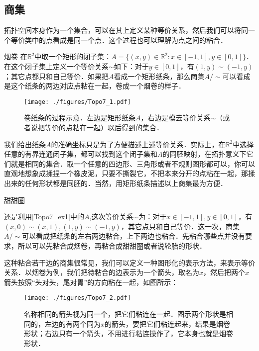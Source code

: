 
\subsection{商集}

拓扑空间本身作为一个集合，可以在其上定义某种等价关系，然后我们可以将同一个等价类中的点看成是同一个点．这个过程也可以理解为点之间的粘合．

\begin{example}{烟卷}\label{Topo7_ex1}
在$\mathbb{R}^2$中取一个矩形的闭子集：$A=\{(x,y)\in\mathbb{R}^2:x\in[-1,1],y\in[0,1]\}$．在这个闭子集上定义一个等价关系$\sim$如下：对于$y\in[0,1]$，有$(1, y)\sim(-1, y)$；其它点都只和自己等价．如果把$A$看成一个矩形纸条，那么商集$A/\sim$可以看成是这个纸条的两边对应点粘在一起，卷成一个烟卷的样子．

\begin{figure}[ht]
\centering
\texttt{[image: ./figures/Topo7\_1.pdf]}
\caption{卷纸条的过程示意．左边是矩形纸条$A$，右边是模去等价关系$\sim$（或者说把等价的点粘在一起）以后得到的集合．} \label{Topo7_fig1}
\end{figure}

\end{example}



我们给出纸条$A$的准确坐标只是为了方便描述上述等价关系．实际上，在$\mathbb{R}^2$中选择任意的有界连通闭子集，都可以找到这个闭子集和$A$的同胚映射，在拓扑意义下它们就是相同的集合．取一个任意的四边形、三角形或者不规则图形都可以，你可以直观地想象成揉捏一个橡皮泥，只要不撕裂它，不把本来分开的点粘在一起，那揉出来的任何形状都是同胚的．当然，用矩形纸条描述以上商集最为方便．

\begin{example}{甜甜圈}

还是利用\autoref{Topo7_ex1}中的$A$,这次等价关系$\sim$为：对于$x\in[-1,1], y\in[0,1]$，有$(x,0)\sim(x,1), (1, y)\sim(-1, y)$，其它点只和自己等价．这一次，商集$A/\sim$可以看成把纸条的左右两边粘合，上下两边也粘合．先粘合哪些点并没有要求，所以可以先粘合成烟卷，再粘合成甜甜圈或者说轮胎的形状．

\end{example}

这种粘合若干边的商集很常见，我们可以定义一种图形化的表示方法，来表示等价关系．以烟卷为例，我们把待粘合的边表示为一个箭头，取名为$x$，然后把两个$x$箭头按照“头对头，尾对胃”的方向粘在一起，如图所示：

\begin{figure}[ht]
\centering
\texttt{[image: ./figures/Topo7\_2.pdf]}
\caption{名称相同的箭头视为同一个，把它们粘连在一起．图示两个形状是相同的，左边的有两个同为$x$的箭头，要把它们粘连起来，结果是烟卷形状；右边只有一个箭头，不用进行粘连操作了，它本身也就是烟卷形状．} \label{Topo7_fig2}
\end{figure}

